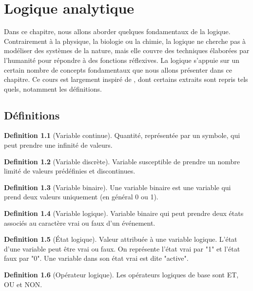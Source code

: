 \documentclass[a4paper,11pt]{book}
\theoremstyle{definition}
\theoremstyle{definition}
\newtheorem{definition}{Definition}[section]
\begin{document}
\chapter{Logique analytique}
Dans ce chapitre, nous allons aborder quelques fondamentaux de la logique. Contrairement à la physique, la biologie ou la chimie, la logique ne cherche pas à modéliser des systèmes de la nature, mais elle couvre des techniques élaborées par l'humanité pour répondre à des fonctions réflexives.
La logique s'appuie sur un certain nombre de concepts fondamentaux que nous allons présenter dans ce chapitre. 
Ce cours est largement inspiré de \cite{systemeslogiquesI}, dont certains extraits sont repris tels quels, notamment les définitions.

\section{Définitions}

\begin{definition}[Variable continue]
Quantité, représentée par un symbole, qui peut prendre une infinité de valeurs.
\end{definition}

\begin{definition}[Variable discrète]
Variable susceptible de prendre un nombre limité de valeurs prédéfinies et discontinues.
\end{definition}

\begin{definition}[Variable binaire]
Une variable binaire est une variable qui prend deux valeurs uniquement (en général 0 ou 1).
\end{definition}

\begin{definition}[Variable logique]
Variable binaire qui peut prendre deux états associés au caractère vrai ou faux d’un événement.
\end{definition}

\begin{definition}[État logique]
Valeur attribuée à une variable logique. L’état d’une variable peut être vrai ou faux. On représente l’état vrai par "1" et l’état faux par "0". Une variable dans son état vrai est dite
"active".
\end{definition}

\begin{definition}[Opérateur logique]
Les opérateurs logiques de base sont ET, OU et NON.
\end{definition}
\end{document}
